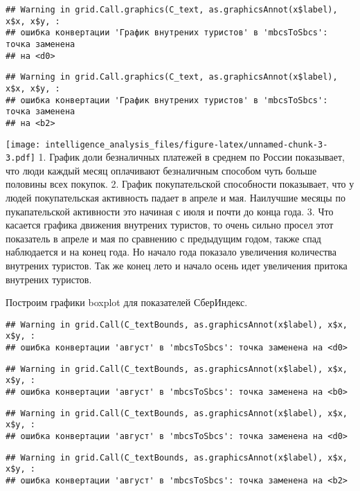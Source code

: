 \documentclass[
]{article}
\begin{document}
\begin{verbatim}
## Warning in grid.Call.graphics(C_text, as.graphicsAnnot(x$label), x$x, x$y, :
## ошибка конвертации 'График внутрених туристов' в 'mbcsToSbcs': точка заменена
## на <d0>
\end{verbatim}

\begin{verbatim}
## Warning in grid.Call.graphics(C_text, as.graphicsAnnot(x$label), x$x, x$y, :
## ошибка конвертации 'График внутрених туристов' в 'mbcsToSbcs': точка заменена
## на <b2>
\end{verbatim}

\texttt{[image: intelligence\_analysis\_files/figure-latex/unnamed-chunk-3-3.pdf]}
1. График доли безналичных платежей в среднем по России показывает, что
люди каждый месяц оплачивают безналичным способом чуть больше половины
всех покупок. 2. График покупательской способности показывает, что у
людей покупательская активность падает в апреле и мая. Наилучшие месяцы
по пукапательской активности это начиная с июля и почти до конца года.
3. Что касается графика движения внутрених туристов, то очень сильно
просел этот показатель в апреле и мая по сравнению с предыдущим годом,
также спад наблюдается и на конец года. Но начало года показало
увеличения количества внутрених туристов. Так же конец лето и начало
осень идет увеличения притока внутрених туристов.

Построим графики boxplot для показателей СберИндекс.

\begin{verbatim}
## Warning in grid.Call(C_textBounds, as.graphicsAnnot(x$label), x$x, x$y, :
## ошибка конвертации 'август' в 'mbcsToSbcs': точка заменена на <d0>
\end{verbatim}

\begin{verbatim}
## Warning in grid.Call(C_textBounds, as.graphicsAnnot(x$label), x$x, x$y, :
## ошибка конвертации 'август' в 'mbcsToSbcs': точка заменена на <b0>
\end{verbatim}

\begin{verbatim}
## Warning in grid.Call(C_textBounds, as.graphicsAnnot(x$label), x$x, x$y, :
## ошибка конвертации 'август' в 'mbcsToSbcs': точка заменена на <d0>
\end{verbatim}

\begin{verbatim}
## Warning in grid.Call(C_textBounds, as.graphicsAnnot(x$label), x$x, x$y, :
## ошибка конвертации 'август' в 'mbcsToSbcs': точка заменена на <b2>
\end{verbatim}
\end{document}
